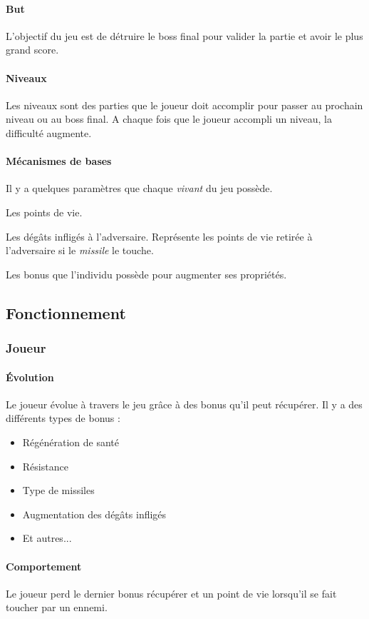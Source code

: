 \documentclass[11pt, a4paper, oneside]{article}
\begin{document}
\paragraph{But}
L'objectif du jeu est de détruire le boss final pour valider la partie et avoir le plus grand score.
\paragraph{Niveaux}
Les niveaux sont des parties que le joueur doit accomplir pour passer au prochain niveau ou au boss final. A chaque fois que le joueur accompli un niveau, la difficulté augmente.
\paragraph{Mécanismes de bases}
Il y a quelques paramètres que chaque \emph{vivant} du jeu possède.
\begin{description}
\setlength{\itemindent}{-.cm}
	\item[— Santé] Les points de vie.
	\item[— Dégâts] Les dégâts infligés à l'adversaire. Représente les points de vie retirée à l'adversaire si le \emph{missile} le touche.
	\item[— Bonus] Les bonus que l'individu possède pour augmenter ses propriétés.
\end{description}
\subsection{Fonctionnement}
\subsubsection{Joueur}
\paragraph{Évolution}
Le joueur évolue à travers le jeu grâce à des bonus qu'il peut récupérer. Il y a des différents types de bonus :
\begin{itemize}
	\item Régénération de santé
	\item Résistance
	\item Type de missiles
	\item Augmentation des dégâts infligés
	\item Et autres...
\end{itemize}
\paragraph{Comportement}
Le joueur perd le dernier bonus récupérer et un point de vie lorsqu'il se fait toucher par un ennemi.
\end{document}
